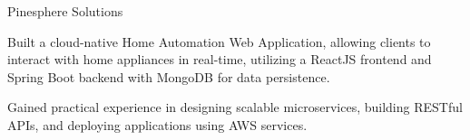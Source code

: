     

   {Pinesphere Solutions} {}
    \resumeItemListStart                
          {
    \item Built a cloud-native Home Automation Web Application, allowing clients to interact with home appliances in real-time, utilizing a ReactJS frontend and Spring Boot backend with MongoDB for data persistence.
  \item Gained practical experience in designing scalable microservices, building RESTful APIs, and deploying applications using AWS services.
  }
\resumeItemListEnd

\resumeSubHeadingListEnd
\vspace{5pt}

